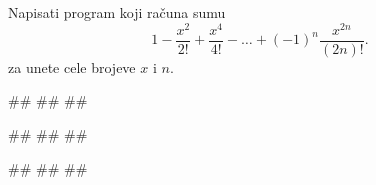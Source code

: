 \begin{Exercise}[difficulty=1, label=1.3_46] 
Napisati program koji računa sumu
$$1 - \frac{x^{2}}{2!} + \frac{x^{4}}{4!} - \ldots +
(-1)^{n}\frac{x^{2n}}{(2n)!}.$$ za unete cele brojeve $x$ i $n$. 

\begin{minitest}
\begin{upotreba}{1}
#\naslovInt#
##
##
\end{upotreba}
\end{minitest}
\begin{minitest}
\begin{upotreba}{2}
#\naslovInt#
##
##
\end{upotreba}
\end{minitest}

\begin{minitest}
\begin{upotreba}{3}
#\naslovInt#
##
##
\end{upotreba}
\end{minitest}

\end{Exercise}
\begin{Answer}[ref=1.3_46]
\end{Answer}


